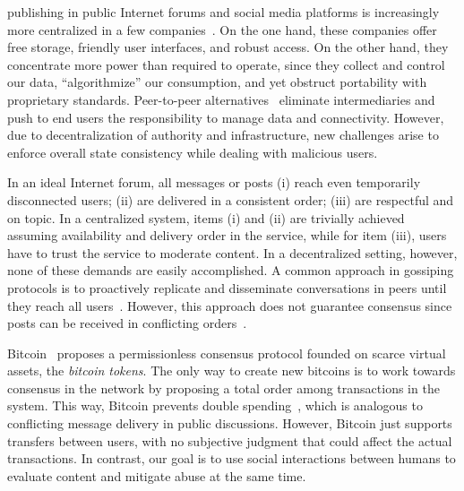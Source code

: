 \documentclass[10pt,journal,compsoc]{IEEEtran}
\begin{document}
 publishing in public Internet forums and social media
platforms is increasingly more centralized in a few
companies~\cite{internet.fixing,p2p.osn}.
%
On the one hand, these companies offer free storage, friendly user interfaces,
and robust access.
On the other hand, they concentrate more power than required to operate, since
they collect and control our data, ``algorithmize'' our consumption, and yet
obstruct portability with proprietary standards.
%
Peer-to-peer alternatives~\cite{p2p.survey} eliminate intermediaries and push
to end users the responsibility to manage data and connectivity.
However, due to decentralization of authority and infrastructure, new
challenges arise to enforce overall state consistency while dealing with
malicious users.

In an ideal Internet forum, all messages or posts
(i)   reach even temporarily disconnected users;
(ii)  are delivered in a consistent order;
(iii) are respectful and on topic.
In a centralized system, items (i) and (ii) are trivially achieved assuming
availability and delivery order in the service, while for item (iii), users
have to trust the service to moderate content.
In a decentralized setting, however, none of these demands are easily
accomplished.
A common approach in gossiping protocols is to proactively replicate and
disseminate conversations in peers until they reach all
users~\cite{p2p.survey}.
However, this approach does not guarantee consensus since posts can be received
in conflicting orders~\cite{p2p.intention}.

Bitcoin~\cite{p2p.bitcoin} proposes a permissionless consensus protocol founded
on scarce virtual assets, the \emph{bitcoin tokens}.
%
The only way to create new bitcoins is to work towards consensus in the network
by proposing a total order among transactions in the system.
%
This way, Bitcoin prevents double spending~\cite{p2p.bitcoin}, which is
analogous to conflicting message delivery in public discussions.
%
However, Bitcoin just supports transfers between users, with no subjective
judgment that could affect the actual transactions.
In contrast, our goal is to use social interactions between humans to evaluate
content and mitigate abuse at the same time.
\end{document}
